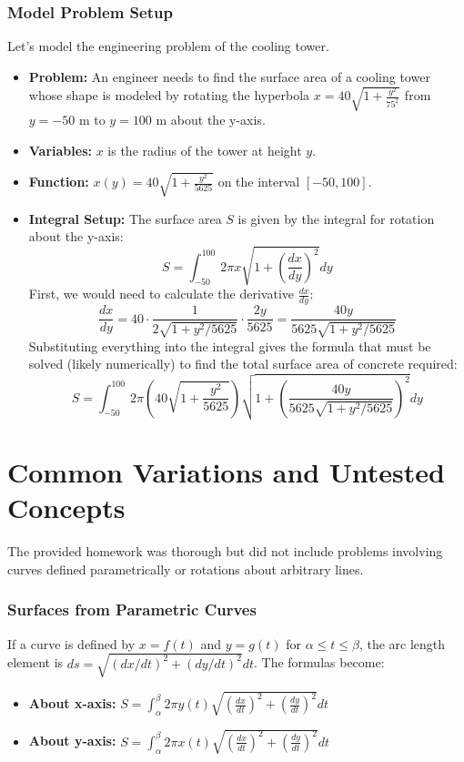 \documentclass{article}
\begin{document}
\section{Model Problem Setup}
Let's model the engineering problem of the cooling tower.
\begin{itemize}
    \item \textbf{Problem:} An engineer needs to find the surface area of a cooling tower whose shape is modeled by rotating the hyperbola \(x = 40\sqrt{1 + \frac{y^2}{75^2}}\) from \(y = -50\) m to \(y = 100\) m about the y-axis.
    \item \textbf{Variables:} \(x\) is the radius of the tower at height \(y\).
    \item \textbf{Function:} \(x(y) = 40\sqrt{1 + \frac{y^2}{5625}}\) on the interval \([-50, 100]\).
    \item \textbf{Integral Setup:} The surface area \(S\) is given by the integral for rotation about the y-axis:
    \[ S = \int_{-50}^{100} 2\pi x \sqrt{1 + \left(\frac{dx}{dy}\right)^2} dy \]
    First, we would need to calculate the derivative \(\frac{dx}{dy}\):
    \[ \frac{dx}{dy} = 40 \cdot \frac{1}{2\sqrt{1 + y^2/5625}} \cdot \frac{2y}{5625} = \frac{40y}{5625\sqrt{1 + y^2/5625}} \]
    Substituting everything into the integral gives the formula that must be solved (likely numerically) to find the total surface area of concrete required:
    \[ S = \int_{-50}^{100} 2\pi \left(40\sqrt{1 + \frac{y^2}{5625}}\right) \sqrt{1 + \left( \frac{40y}{5625\sqrt{1 + y^2/5625}} \right)^2} dy \]
\end{itemize}

\part*{Common Variations and Untested Concepts}
The provided homework was thorough but did not include problems involving curves defined parametrically or rotations about arbitrary lines.

\section{Surfaces from Parametric Curves}
If a curve is defined by \(x=f(t)\) and \(y=g(t)\) for \(\alpha \le t \le \beta\), the arc length element is \(ds = \sqrt{(dx/dt)^2 + (dy/dt)^2} dt\). The formulas become:
\begin{itemize}
    \item \textbf{About x-axis:} \(S = \int_{\alpha}^{\beta} 2\pi y(t) \sqrt{\left(\frac{dx}{dt}\right)^2 + \left(\frac{dy}{dt}\right)^2} dt\)
    \item \textbf{About y-axis:} \(S = \int_{\alpha}^{\beta} 2\pi x(t) \sqrt{\left(\frac{dx}{dt}\right)^2 + \left(\frac{dy}{dt}\right)^2} dt\)
\end{itemize}
\end{document}
